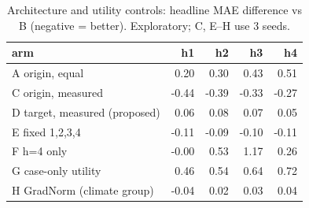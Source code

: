 \begin{table}[t]
\centering
\small
\caption{Architecture and utility controls: headline MAE difference vs B (negative = better). Exploratory; C, E--H use 3 seeds.}
\label{tab:controls-vs-B}
\begin{tabular}{lrrrr}
\toprule
arm & h1 & h2 & h3 & h4 \\
\midrule
A origin, equal & 0.20 & 0.30 & 0.43 & 0.51 \\
C origin, measured & -0.44 & -0.39 & -0.33 & -0.27 \\
D target, measured (proposed) & 0.06 & 0.08 & 0.07 & 0.05 \\
E fixed 1,2,3,4 & -0.11 & -0.09 & -0.10 & -0.11 \\
F h=4 only & -0.00 & 0.53 & 1.17 & 0.26 \\
G case-only utility & 0.46 & 0.54 & 0.64 & 0.72 \\
H GradNorm (climate group) & -0.04 & 0.02 & 0.03 & 0.04 \\
\bottomrule
\end{tabular}
\end{table}
